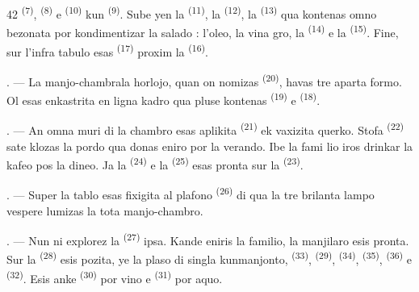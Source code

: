 \begin{VUpage}[44]{42}
\VUcontinue
{} \textsuperscript{(7)},  \textsuperscript{(8)} e  \textsuperscript{(10)} kun\nl
{} \textsuperscript{(9)}. Sube yen la  \textsuperscript{(11)}, la  \textsuperscript{(12)},\nl
la  \textsuperscript{(13)} qua kontenas omno bezonata\nl
por kondimentizar la salado : l'oleo, la vina\cc
gro, la  \textsuperscript{(14)} e la  \textsuperscript{(15)}. Fine, sur l'infra\nl
tabulo esas  \textsuperscript{(17)} proxim la  \textsuperscript{(16)}.

. --- La manjo-chambrala horlojo, quan on\nl
nomizas  \textsuperscript{(20)}, havas tre aparta\nl
formo. Ol esas enkastrita en ligna kadro qua\nl
pluse kontenas  \textsuperscript{(19)} e  \textsuperscript{(18)}.

\VUsaut{4.6mm}
\VUsaut{3.0mm}

. --- An omna muri di la chambro esas\nl
aplikita  \textsuperscript{(21)} ek vaxizita querko.\nl
Stofa  \textsuperscript{(22)} sate klozas la pordo\nl
qua donas eniro por la verando. Ibe la fami\cc
lio iros drinkar la kafeo pos la dineo. Ja la\nl
{} \textsuperscript{(24)} e la  \textsuperscript{(25)} esas pronta sur la\nl
{} \textsuperscript{(23)}.

. --- Super la tablo esas fixigita al plafono\nl
{} \textsuperscript{(26)} di qua la tre brilanta lampo\nl
vespere lumizas la tota manjo-chambro.

. --- Nun ni explorez la  \textsuperscript{(27)}\nl
ipsa. Kande eniris la familio, la manjilaro esis\nl
pronta. Sur la  \textsuperscript{(28)} esis pozita, ye\nl
la plaso di singla kunmanjonto,  \textsuperscript{(33)},\nl
{} \textsuperscript{(29)},  \textsuperscript{(34)},  \textsuperscript{(35)}, \cc
{} \textsuperscript{(36)} e  \textsuperscript{(32)}. Esis anke  \textsuperscript{(30)} por vino\nl
e  \textsuperscript{(31)} por aquo.


\end{VUpage}
